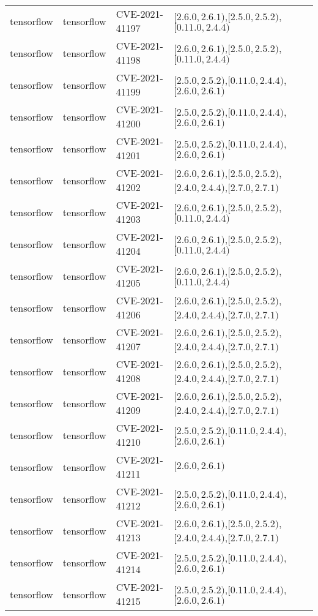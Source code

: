 \begin{tabular}{llll}
tensorflow & tensorflow & CVE-2021-41197 & $[2.6.0,2.6.1)$,$[2.5.0,2.5.2)$,$[0.11.0,2.4.4)$ \\
tensorflow & tensorflow & CVE-2021-41198 & $[2.6.0,2.6.1)$,$[2.5.0,2.5.2)$,$[0.11.0,2.4.4)$ \\
tensorflow & tensorflow & CVE-2021-41199 & $[2.5.0,2.5.2)$,$[0.11.0,2.4.4)$,$[2.6.0,2.6.1)$ \\
tensorflow & tensorflow & CVE-2021-41200 & $[2.5.0,2.5.2)$,$[0.11.0,2.4.4)$,$[2.6.0,2.6.1)$ \\
tensorflow & tensorflow & CVE-2021-41201 & $[2.5.0,2.5.2)$,$[0.11.0,2.4.4)$,$[2.6.0,2.6.1)$ \\
tensorflow & tensorflow & CVE-2021-41202 & $[2.6.0,2.6.1)$,$[2.5.0,2.5.2)$,$[2.4.0,2.4.4)$,$[2.7.0,2.7.1)$ \\
tensorflow & tensorflow & CVE-2021-41203 & $[2.6.0,2.6.1)$,$[2.5.0,2.5.2)$,$[0.11.0,2.4.4)$ \\
tensorflow & tensorflow & CVE-2021-41204 & $[2.6.0,2.6.1)$,$[2.5.0,2.5.2)$,$[0.11.0,2.4.4)$ \\
tensorflow & tensorflow & CVE-2021-41205 & $[2.6.0,2.6.1)$,$[2.5.0,2.5.2)$,$[0.11.0,2.4.4)$ \\
tensorflow & tensorflow & CVE-2021-41206 & $[2.6.0,2.6.1)$,$[2.5.0,2.5.2)$,$[2.4.0,2.4.4)$,$[2.7.0,2.7.1)$ \\
tensorflow & tensorflow & CVE-2021-41207 & $[2.6.0,2.6.1)$,$[2.5.0,2.5.2)$,$[2.4.0,2.4.4)$,$[2.7.0,2.7.1)$ \\
tensorflow & tensorflow & CVE-2021-41208 & $[2.6.0,2.6.1)$,$[2.5.0,2.5.2)$,$[2.4.0,2.4.4)$,$[2.7.0,2.7.1)$ \\
tensorflow & tensorflow & CVE-2021-41209 & $[2.6.0,2.6.1)$,$[2.5.0,2.5.2)$,$[2.4.0,2.4.4)$,$[2.7.0,2.7.1)$ \\
tensorflow & tensorflow & CVE-2021-41210 & $[2.5.0,2.5.2)$,$[0.11.0,2.4.4)$,$[2.6.0,2.6.1)$ \\
tensorflow & tensorflow & CVE-2021-41211 & $[2.6.0,2.6.1)$ \\
tensorflow & tensorflow & CVE-2021-41212 & $[2.5.0,2.5.2)$,$[0.11.0,2.4.4)$,$[2.6.0,2.6.1)$ \\
tensorflow & tensorflow & CVE-2021-41213 & $[2.6.0,2.6.1)$,$[2.5.0,2.5.2)$,$[2.4.0,2.4.4)$,$[2.7.0,2.7.1)$ \\
tensorflow & tensorflow & CVE-2021-41214 & $[2.5.0,2.5.2)$,$[0.11.0,2.4.4)$,$[2.6.0,2.6.1)$ \\
tensorflow & tensorflow & CVE-2021-41215 & $[2.5.0,2.5.2)$,$[0.11.0,2.4.4)$,$[2.6.0,2.6.1)$ \\

\end{tabular}
